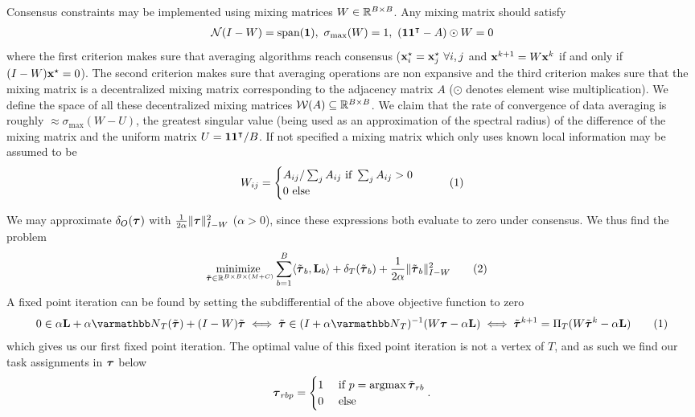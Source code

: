 \documentclass{article}
\newcommand\numberthis{\addtocounter{equation}{1}\tag{\theequation}}
\begin{document}
 Consensus constraints may be implemented using mixing matrices $W\in\mathbb{R}^{B\times B}$.
Any mixing matrix \cite{xiao2004fast} should satisfy
\begin{align*}
    \cN(I - W) = \text{span} (\vone),\ \sigma_\text{max}(W) = 1,\ (\vone\vone^\T - A) \odot W = 0
\end{align*}
where the first criterion makes sure that averaging algorithms reach consensus (${\mathbf{x}}_i^\star = {\mathbf{x}}_j^\star\  \forall i,j$ and ${\mathbf{x}}^{k+1} = W{\mathbf{x}}^k$ if and only if $(I-W){\mathbf{x}}^\star = 0$). The second criterion makes sure that averaging operations are non expansive and the third criterion makes sure that the mixing matrix is a decentralized mixing matrix corresponding to the adjacency matrix $A$ ($\odot$ denotes element wise multiplication). We define the space of all these decentralized mixing matrices ${\mathcal{W}}(A) \subseteq \mathbb{R}^{B \times B}$. We claim that the rate of convergence of data averaging is roughly $\approx\sigma_{\text{max}}(W-U)$, the greatest singular value (being used as an approximation of the spectral radius) of the difference of the mixing matrix and the uniform matrix $U = {\mathbf{1}}{\mathbf{1}}^\intercal/B$. If not specified a mixing matrix which only uses known local information may be assumed to be
\begin{align*}
    W_{ij} = \begin{cases}
        A_{ij} / \sum_j A_{ij} \text{ if } \sum_j A_{ij} > 0 \\
        0 \text{ else }
    \end{cases}\numberthis\label{eq:unicoorooron}
\end{align*}


 We may approximate $\delta_O(\boldsymbol{\tau})$ with $\frac{1}{2\alpha}\|\boldsymbol{\tau}\|^2_{I-W}$ ($\alpha > 0$), since these expressions both evaluate to zero under consensus. We thus find the problem
\begin{align*}
    \underset{\tilde{\vtau} \in \RR^{B \times B \times (M+C)}}{\text{minimize }} & \sum^B_{b=1}\langle \tilde{\vtau}_b, \vL_b \rangle + \delta_T(\tilde{\vtau}_b) + \frac{1}{2\alpha}\|\tilde{\vtau}_b\|^2_{I-W}
    \numberthis \label{eq:objective_function_pgd}
\end{align*}
A fixed point iteration can be found by setting the subdifferential of the above objective function to zero
\begin{align*}
    0 \in \alpha \vL + \alpha \opN_T(\tilde{\vtau}) + (I-W)\tilde{\vtau}
    \iff
    \tilde{\vtau} \in (I + \alpha \opN_T)^{-1}(W\vtau - \alpha \vL)
    \iff
    \tilde{\vtau}^{k+1} = \Pi_T(W\tilde{\vtau}^{k} - \alpha \vL)
    \numberthis \label{eq:fpi1}
\end{align*}
which gives us our first fixed point iteration. The optimal value of this fixed point iteration is not a vertex of $T$, and as such we find our task assignments in $\boldsymbol{\tau}$ below
\begin{align*}
    \boldsymbol{\tau}_{rbp} = \begin{cases}
        1 & \text{ if } p = \operatorname*{argmax} \tilde{\boldsymbol{\tau}}_{rb} \\
        0 & \text{ else }
    \end{cases}.
\end{align*}
\end{document}
